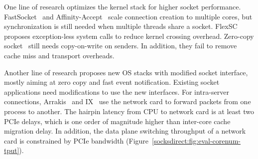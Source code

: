 



\iffalse
{}
One line of research optimizes the kernel stack for higher socket performance. FastSocket~\cite{lin2016scalable} and Affinity-Accept~\cite{pesterev2012improving} scale connection creation to multiple cores, but synchronization is still needed when multiple threads share a socket.
FlexSC~\cite{soares2010flexsc} proposes exception-less system calls to reduce kernel crossing overhead.
Zero-copy socket~\cite{thadani1995efficient,chu1996zero} still needs copy-on-write on senders.
In addition, they fail to remove cache miss and transport overheads.


Another line of research proposes new OS stacks with modified socket interface, mostly aiming at zero copy and fast event notification. Existing socket applications need modifications to use the new interfaces.
For intra-server connections, Arrakis~\cite{peter2016arrakis} and IX~\cite{belay2017ix} use the network card to forward packets from one process to another. The hairpin latency from CPU to network card is at least two PCIe delays, which is one order of magnitude higher than inter-core cache migration delay. In addition, the data plane switching throughput of a network card is constrained by PCIe bandwidth (Figure~\ref{socksdirect:fig:eval-corenum-tput}).

